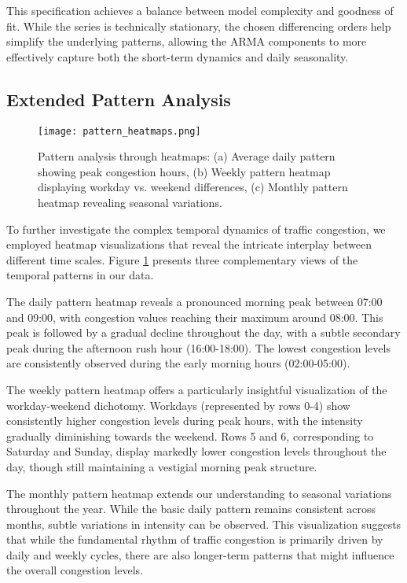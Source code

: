 \documentclass{article}
\begin{document}
This specification achieves a balance between model complexity and goodness of fit. While the series is technically stationary, the chosen differencing orders help simplify the underlying patterns, allowing the ARMA components to more effectively capture both the short-term dynamics and daily seasonality.

\subsection{Extended Pattern Analysis}
\begin{figure}[htbp]
    \centering
    \texttt{[image: pattern\_heatmaps.png]}
    \caption{Pattern analysis through heatmaps: (a) Average daily pattern showing peak congestion hours, (b) Weekly pattern heatmap displaying workday vs. weekend differences, (c) Monthly pattern heatmap revealing seasonal variations.}
    \label{fig:heatmaps}
\end{figure}

To further investigate the complex temporal dynamics of traffic congestion, we employed heatmap visualizations that reveal the intricate interplay between different time scales. Figure \ref{fig:heatmaps} presents three complementary views of the temporal patterns in our data.

The daily pattern heatmap reveals a pronounced morning peak between 07:00 and 09:00, with congestion values reaching their maximum around 08:00. This peak is followed by a gradual decline throughout the day, with a subtle secondary peak during the afternoon rush hour (16:00-18:00). The lowest congestion levels are consistently observed during the early morning hours (02:00-05:00).

The weekly pattern heatmap offers a particularly insightful visualization of the workday-weekend dichotomy. Workdays (represented by rows 0-4) show consistently higher congestion levels during peak hours, with the intensity gradually diminishing towards the weekend. Rows 5 and 6, corresponding to Saturday and Sunday, display markedly lower congestion levels throughout the day, though still maintaining a vestigial morning peak structure.

The monthly pattern heatmap extends our understanding to seasonal variations throughout the year. While the basic daily pattern remains consistent across months, subtle variations in intensity can be observed. This visualization suggests that while the fundamental rhythm of traffic congestion is primarily driven by daily and weekly cycles, there are also longer-term patterns that might influence the overall congestion levels.
\end{document}
